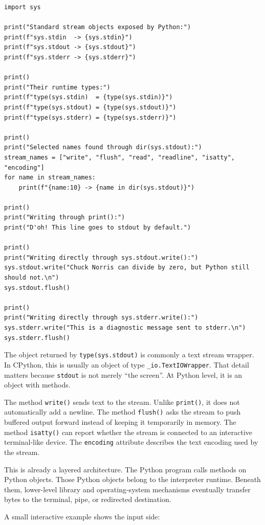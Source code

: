 \begin{verbatim}
import sys

print("Standard stream objects exposed by Python:")
print(f"sys.stdin  -> {sys.stdin}")
print(f"sys.stdout -> {sys.stdout}")
print(f"sys.stderr -> {sys.stderr}")

print()
print("Their runtime types:")
print(f"type(sys.stdin)  = {type(sys.stdin)}")
print(f"type(sys.stdout) = {type(sys.stdout)}")
print(f"type(sys.stderr) = {type(sys.stderr)}")

print()
print("Selected names found through dir(sys.stdout):")
stream_names = ["write", "flush", "read", "readline", "isatty", "encoding"]
for name in stream_names:
    print(f"{name:10} -> {name in dir(sys.stdout)}")

print()
print("Writing through print():")
print("D'oh! This line goes to stdout by default.")

print()
print("Writing directly through sys.stdout.write():")
sys.stdout.write("Chuck Norris can divide by zero, but Python still should not.\n")
sys.stdout.flush()

print()
print("Writing directly through sys.stderr.write():")
sys.stderr.write("This is a diagnostic message sent to stderr.\n")
sys.stderr.flush()
\end{verbatim}

The object returned by \texttt{type(sys.stdout)} is commonly a text stream wrapper. In CPython, this is usually an object of type \texttt{\_io.TextIOWrapper}. That detail matters because \texttt{stdout} is not merely ``the screen''. At Python level, it is an object with methods.

The method \texttt{write()} sends text to the stream. Unlike \texttt{print()}, it does not automatically add a newline. The method \texttt{flush()} asks the stream to push buffered output forward instead of keeping it temporarily in memory. The method \texttt{isatty()} can report whether the stream is connected to an interactive terminal-like device. The \texttt{encoding} attribute describes the text encoding used by the stream.

This is already a layered architecture. The Python program calls methods on Python objects. Those Python objects belong to the interpreter runtime. Beneath them, lower-level library and operating-system mechanisms eventually transfer bytes to the terminal, pipe, or redirected destination.

A small interactive example shows the input side:

